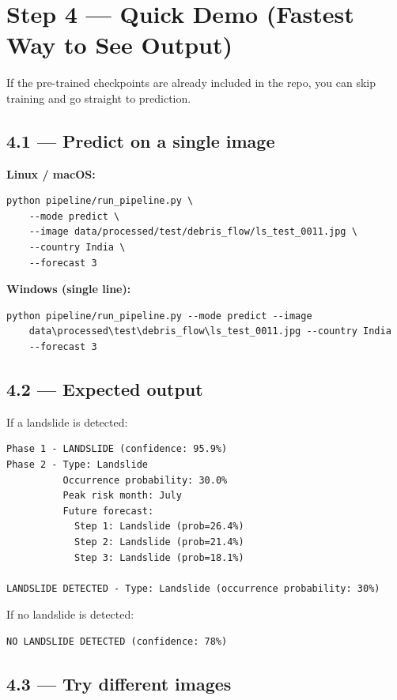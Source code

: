 \documentclass[11pt]{article}
\begin{document}
\section{Step 4 --- Quick Demo (Fastest Way to See Output)}

If the pre-trained checkpoints are already included in the repo, you can skip training and go straight to prediction.

\subsection{4.1 --- Predict on a single image}

\textbf{Linux / macOS:}
\begin{verbatim}
python pipeline/run_pipeline.py \
    --mode predict \
    --image data/processed/test/debris_flow/ls_test_0011.jpg \
    --country India \
    --forecast 3
\end{verbatim}

\textbf{Windows (single line):}
\begin{verbatim}
python pipeline/run_pipeline.py --mode predict --image
    data\processed\test\debris_flow\ls_test_0011.jpg --country India
    --forecast 3
\end{verbatim}

\subsection{4.2 --- Expected output}

If a landslide is detected:
\begin{verbatim}
Phase 1 - LANDSLIDE (confidence: 95.9%)
Phase 2 - Type: Landslide
          Occurrence probability: 30.0%
          Peak risk month: July
          Future forecast:
            Step 1: Landslide (prob=26.4%)
            Step 2: Landslide (prob=21.4%)
            Step 3: Landslide (prob=18.1%)

LANDSLIDE DETECTED - Type: Landslide (occurrence probability: 30%)
\end{verbatim}

If no landslide is detected:
\begin{verbatim}
NO LANDSLIDE DETECTED (confidence: 78%)
\end{verbatim}

\subsection{4.3 --- Try different images}
\end{document}
